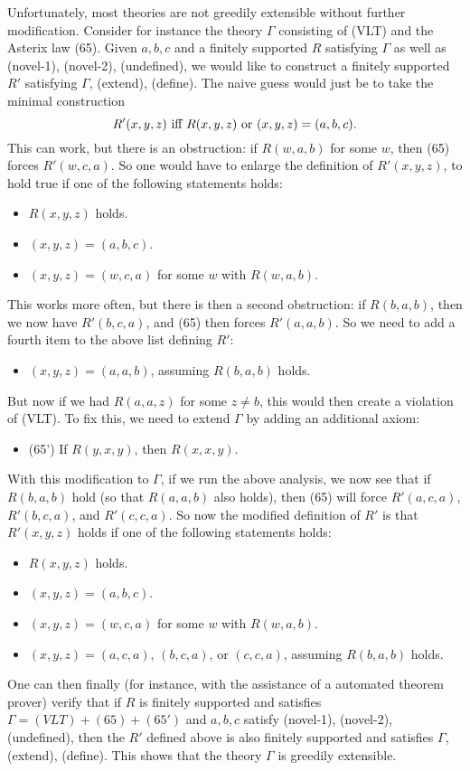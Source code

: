 Unfortunately, most theories are not greedily extensible without further modification.  Consider for instance the theory $\Gamma$ consisting of (VLT) and the Asterix law (65).  Given $a,b,c$ and a finitely supported $R$ satisfying $\Gamma$ as well as (novel-1), (novel-2), (undefined), we would like to construct a finitely supported  $R'$ satisfying $\Gamma$, (extend), (define).  The naive guess would just be to take the minimal construction
$$ R'(x,y,z) \hbox{ iff } R(x,y,z) \hbox{ or } (x,y,z) = (a,b,c).$$
This can work, but there is an obstruction: if $R(w,a,b)$ for some $w$, then (65) forces $R'(w,c,a)$.  So one would have to enlarge the definition of $R'(x,y,z)$, to hold true if one of the following statements holds:
\begin{itemize}
  \item $R(x,y,z)$ holds.
  \item $(x,y,z) = (a,b,c)$.
  \item $(x,y,z) = (w,c,a)$ for some $w$ with $R(w,a,b)$.
\end{itemize}
This works more often, but there is then a second obstruction: if $R(b,a,b)$, then we now have $R'(b,c,a)$, and (65) then forces $R'(a,a,b)$.  So we need to add a fourth item to the above list defining $R'$:
\begin{itemize}
  \item $(x,y,z) = (a,a,b)$, assuming $R(b,a,b)$ holds.
\end{itemize}
But now if we had $R(a,a,z)$ for some $z \neq b$, this would then create a violation of (VLT).  To fix this, we need to extend $\Gamma$ by adding an additional axiom:
\begin{itemize}
  \item (65') If $R(y,x,y)$, then $R(x,x,y)$.
\end{itemize}
With this modification to $\Gamma$, if we run the above analysis, we now see that if $R(b,a,b)$ hold (so that $R(a,a,b)$ also holds), then (65) will force $R'(a,c,a)$, $R'(b,c,a)$, and $R'(c,c,a)$.  So now the modified definition of $R'$ is that $R'(x,y,z)$ holds if one of the following statements holds:
\begin{itemize}
  \item $R(x,y,z)$ holds.
  \item $(x,y,z) = (a,b,c)$.
  \item $(x,y,z) = (w,c,a)$ for some $w$ with $R(w,a,b)$.
  \item $(x,y,z) = (a,c,a)$, $(b,c,a)$, or $(c,c,a)$, assuming $R(b,a,b)$ holds.
\end{itemize}
One can then finally (for instance, with the assistance of a automated theorem prover) verify that if $R$ is finitely supported and satisfies $\Gamma = (VLT) + (65) + (65')$ and $a,b,c$ satisfy (novel-1), (novel-2), (undefined), then the $R'$ defined above is also finitely supported and satisfies $\Gamma$, (extend), (define).  This shows that the theory $\Gamma$ is greedily extensible.

